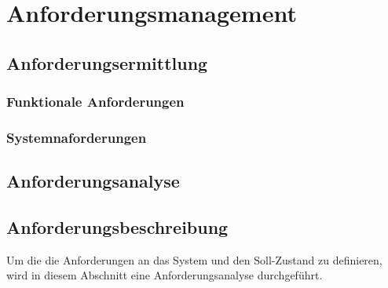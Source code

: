 \chapter{Anforderungsmanagement}
\section{Anforderungsermittlung}
\subsection{Funktionale Anforderungen}
\subsection{Systemnaforderungen}
\section{Anforderungsanalyse}
\section{Anforderungsbeschreibung}

Um die die Anforderungen an das System und den Soll-Zustand zu definieren, wird in diesem Abschnitt eine Anforderungsanalyse durchgeführt. 

%

